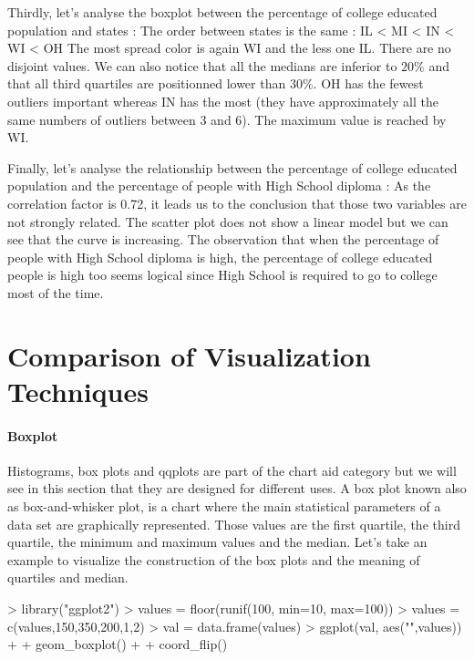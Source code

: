 \documentclass{article}
\begin{document}
Thirdly, let's analyse the boxplot between the percentage of college educated population and states : 
The order between states is the same : IL < MI < IN < WI < OH 
The most spread color is again WI and the less one IL. There are no disjoint values.
We can also notice that all the medians are inferior to $20\%$ and that all third quartiles are positionned lower than $30\%$.
OH has the fewest outliers important whereas IN has the most (they have approximately all the same numbers of outliers between 3 and 6). The maximum value is reached by WI.

Finally, let's analyse the relationship between the percentage of college educated population and the percentage of people with High School diploma : 
As the correlation factor is 0.72, it leads us to the conclusion that those two variables are not strongly related.
The scatter plot does not show a linear model but we can see that the curve is increasing. The observation that when the percentage of people with High School diploma is high, the percentage of college educated people is high too seems logical since High School is required to go to college most of the time.



\section{Comparison of Visualization Techniques}
\paragraph{Boxplot}
Histograms, box plots and qqplots are part of the chart aid category but we will see in this section that they are designed for different uses.
A box plot known also as box-and-whisker plot, is a chart where the main statistical parameters of a data set are graphically represented. 
Those values are the first quartile, the third quartile, the minimum and maximum values and the median. Let's take an example to visualize the construction of the box plots and the meaning of quartiles and median.

\begin{Schunk}
\begin{Sinput}
> library("ggplot2")
> values = floor(runif(100, min=10, max=100))
> values = c(values,150,350,200,1,2)
> val = data.frame(values)
> ggplot(val, aes("",values)) +
+ geom_boxplot() +
+ coord_flip() 
\end{Sinput}
\end{Schunk}
\end{document}
